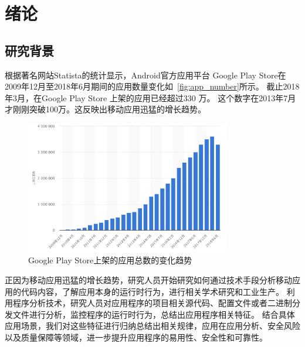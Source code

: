 \chapter {绪论}
\label{chp:intro}

\section{研究背景}

根据著名网站Statista的统计\cite{GoogleP55:online}显示，Android官方应用平台 Google Play Store在2009年12月至2018年6月期间的应用数量变化如~\autoref{fig:app_number}所示。
截止2018年3月，在Google Play Store 上架的应用已经超过330 万。
这个数字在2013年7月才刚刚突破100万。这反映出移动应用迅猛的增长趋势。

\begin{figure}[h]
	\centering
	\includegraphics[width=0.8\textwidth]{./Figures/app-numbers.png}
	\caption{Google Play Store上架的应用总数的变化趋势}
	\label{fig:app_number}
\end{figure}


正因为移动应用迅猛的增长趋势，研究人员开始研究如何通过技术手段分析移动应用的代码内容，了解应用本身的运行时行为，进行相关学术研究和工业生产。
利用程序分析技术，研究人员对应用程序的项目相关源代码、配置文件或者二进制分发文件进行分析，监控程序的运行时行为，总结出应用程序相关特征。
结合具体应用场景，我们对这些特征进行归纳总结出相关规律，应用在应用分析、安全风险以及质量保障等领域，进一步提升应用程序的易用性、安全性和可靠性。

